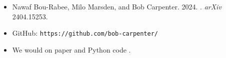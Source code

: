\documentclass[10pt]{report}
\begin{document}
\begin{itemize}
\item Nawaf Bou-Rabee, Milo Marsden, and Bob Carpenter. 2024. . \textit{arXiv} 2404.15253.
\item GitHub: \texttt{https://github.com/bob-carpenter/}
\vfill
\item We would  on paper and
  Python code .
\end{itemize}
\end{document}
